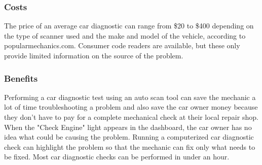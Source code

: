 \subsubsection{Costs}
The price of an average car diagnostic can range from \$20 to \$400 depending on the type of scanner used and the make and model of the vehicle, according to popularmechanics.com. Consumer code readers are available, but these only provide limited information on the source of the problem.\cite{7}

\subsubsection{Benefits}
Performing a car diagnostic test using an auto scan tool can save the mechanic a lot of time troubleshooting a problem and also save the car owner money because they don't have to pay for a complete mechanical check at their local repair shop. When the "Check Engine" light appears in the dashboard, the car owner has no idea what could be causing the problem. Running a computerized car diagnostic check can highlight the problem so that the mechanic can fix only what needs to be fixed. Most car diagnostic checks can be performed in under an hour.\cite{7}



